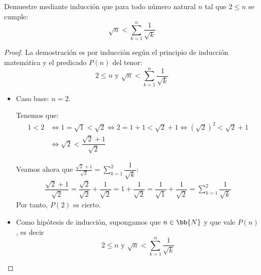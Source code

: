 \begin{ejercicio}
Demuestre mediante inducción que para todo número natural $n$ tal que $2 \leq n$ se cumple:
\begin{equation*}
    \sqrt{n} < \sum_{k=1}^n \dfrac{1}{\sqrt{k}}
\end{equation*}
\begin{proof}
    La demostración es por inducción según el principio de inducción matemática y el predicado $P(n)$ del tenor:
    \begin{equation*}
        2\leq n \text{\ y \ } \sqrt{n} < \sum_{k=1}^n \dfrac{1}{\sqrt{k}}
    \end{equation*}
    \begin{itemize}
        \item Caso base: $n = 2$.
        
        Tenemos que:
        \begin{align*}
            1 < 2 &\Longleftrightarrow 1 = \sqrt{1} < \sqrt{2}
            \Longleftrightarrow 2 = 1+1 < \sqrt{2} +1
            \Longleftrightarrow (\sqrt{2})^2 < \sqrt{2} + 1\\
            &\Longleftrightarrow \sqrt{2} < \dfrac{\sqrt{2}+1}{\sqrt{2}}
        \end{align*}

        Veamos ahora que $\frac{\sqrt{2}+1}{\sqrt{2}} = \sum\limits_{k=1}^2 \dfrac{1}{\sqrt{k}}$:
        \begin{align*}
            \dfrac{\sqrt{2}+1}{\sqrt{2}}= \dfrac{\sqrt{2}}{\sqrt{2}}+\dfrac{1}{\sqrt{2}}
            = 1 + \dfrac{1}{\sqrt{2}}
            = \dfrac{1}{\sqrt{1}} + \dfrac{1}{\sqrt{2}}
            = \sum_{k=1}^2 \dfrac{1}{\sqrt{k}}
        \end{align*}
        Por tanto, $P(2)$ es cierto.

        \item Como hipótesis de inducción, supongamos que $n \in \bb{N}$ y que vale $P(n)$, es decir
        \begin{equation*}
            2\leq n \text{\ y \ } \sqrt{n} < \sum_{k=1}^n \dfrac{1}{\sqrt{k}}
        \end{equation*}


\end{itemize}
\end{proof}
\end{ejercicio}
